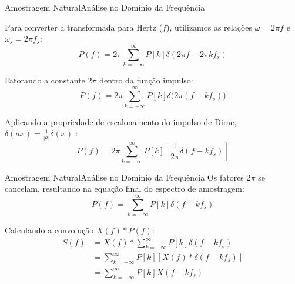 \begin{frame}{Amostragem Natural}{Análise no Domínio da Frequência}
	
	Para converter a transformada para Hertz ($f$), utilizamos as relações $\omega = 2\pi f$ e $\omega_s = 2\pi f_s$:
	\begin{equation*}
		P(f) = 2\pi \sum_{k=-\infty}^{\infty} P[k] \delta(2\pi f - 2\pi k f_s)
	\end{equation*}
	
	Fatorando a constante $2\pi$ dentro da função impulso:
	\begin{equation*}
		P(f) = 2\pi \sum_{k=-\infty}^{\infty} P[k] \delta\big(2\pi(f - k f_s)\big)
	\end{equation*}
	
	Aplicando a propriedade de escalonamento do impulso de Dirac, $\delta(ax) = \frac{1}{|a|}\delta(x)$  \cite{oppenheim1997signals}:
	\begin{equation*}
		P(f) = 2\pi \sum_{k=-\infty}^{\infty} P[k] \left[ \frac{1}{2\pi} \delta(f - k f_s) \right]
	\end{equation*}
	
\end{frame}

\begin{frame}{Amostragem Natural}{Análise no Domínio da Frequência}
	Os fatores $2\pi$ se cancelam, resultando na equação final do espectro de amostragem:
	\begin{equation}
		P(f) = \sum_{k=-\infty}^{\infty} P[k] \delta(f - k f_s)
		\label{eq: pf_natural}
	\end{equation}
	
	Calculando a convolução $X(f) * P(f)$:
	\begin{align*}
		S(f) &= X(f) * \sum_{k=-\infty}^{\infty} P[k] \delta(f - k f_s) \\[4pt]
		&= \sum_{k=-\infty}^{\infty} P[k] \left[ X(f) * \delta(f - k f_s) \right] \\[4pt]
		&= \sum_{k=-\infty}^{\infty} P[k] X(f - k f_s)
	\end{align*}
\end{frame}

